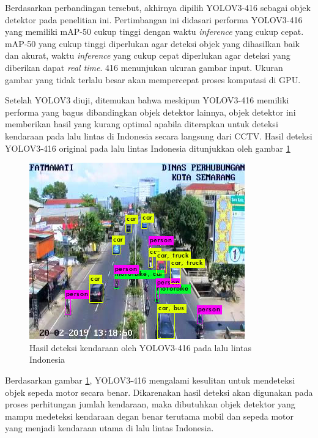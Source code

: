 \documentclass[conference]{IEEEtran}
\begin{document}
Berdasarkan perbandingan tersebut, akhirnya dipilih YOLOV3-416 sebagai objek detektor pada penelitian ini. Pertimbangan ini didasari performa YOLOV3-416 yang memiliki mAP-50 cukup tinggi dengan waktu \textit{inference} yang cukup cepat. 
mAP-50 yang cukup tinggi diperlukan agar deteksi objek yang dihasilkan baik dan akurat, waktu \textit{inference} yang cukup cepat diperlukan agar deteksi yang diberikan dapat \textit{real time}. 416 menunjukan ukuran gambar input. Ukuran gambar yang tidak terlalu besar akan mempercepat proses komputasi di GPU.

Setelah YOLOV3 diuji, ditemukan bahwa meskipun YOLOV3-416 memiliki performa yang bagus dibandingkan objek detektor lainnya, objek detektor ini memberikan hasil yang kurang optimal apabila diterapkan untuk deteksi kendaraan pada lalu lintas di Indonesia secara langsung dari CCTV. Hasil deteksi YOLOV3-416 original pada lalu lintas Indonesia ditunjukkan oleh gambar \ref{yoloV3_ori}

\begin{figure}[htp]
	\centering
	\includegraphics[scale=0.5]{yoloV3}
	\caption{Hasil deteksi kendaraan oleh YOLOV3-416 pada lalu lintas Indonesia}
	\label{yoloV3_ori}
\end{figure}
Berdasarkan gambar \ref{yoloV3_ori}, YOLOV3-416 mengalami kesulitan untuk mendeteksi objek sepeda motor secara benar.
Dikarenakan hasil deteksi akan digunakan pada proses perhitungan jumlah kendaraan, maka dibutuhkan objek detektor yang mampu medeteksi kendaraan degan benar terutama mobil dan sepeda motor yang menjadi kendaraan utama di lalu lintas Indonesia.
\end{document}
